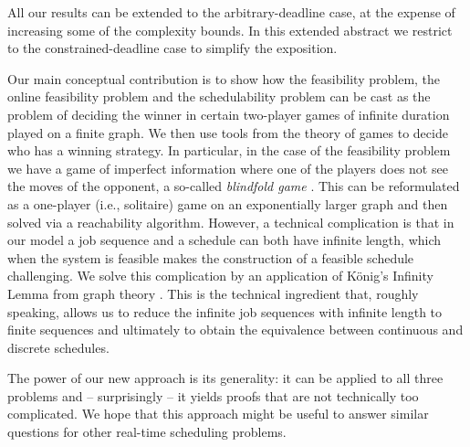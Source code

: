 \documentclass{llncs}
\begin{document}
\begin{comment}
\begin{table}[t]
\begin{center}
\caption{Summary of the results}
\label{tab:bounds}
\begin{tabular}{lc}
\textbf{Problem} & \textbf{Complexity bound} \\
\hline
Feasibility & EXPSPACE \\
Online feasibility & EXPTIME \\
Schedulability & PSPACE
\end{tabular}
\end{center}
\end{table}
\end{comment}

All our results can be extended to the arbitrary-deadline case, at the expense of increasing some of the complexity bounds. In this extended abstract we restrict to the constrained-deadline case to simplify the exposition. 


Our main conceptual contribution is to show how the feasibility problem, the online feasibility problem and the schedulability problem can be cast as the problem of deciding the winner in certain two-player games of infinite duration played on a finite graph. We then use tools from the theory of games to decide who has a winning strategy. In particular, in the case of the feasibility problem we have a game of imperfect information where one of the players does not see the moves of the opponent, a so-called \emph{blindfold game} \cite{Reif:1984}. This can be reformulated as a one-player (i.e., solitaire) game on an exponentially larger graph and then solved via a reachability algorithm. However, a technical complication is that in our model a job sequence and a schedule can both have infinite length, which when the system is feasible makes the construction of a feasible schedule challenging. We solve this complication by an application of K\"onig's Infinity Lemma from graph theory \cite{Diestel:2005}. This is the technical ingredient that, roughly speaking, allows us to reduce the infinite job  sequences with infinite  length  to finite sequences and ultimately to obtain the equivalence between continuous and discrete schedules. 

The power of our new approach is its generality: it can be applied to all three problems and -- surprisingly -- it yields proofs that are not technically too complicated. 
We hope that this approach might be useful to answer similar questions for other real-time scheduling problems. 
\end{document}
